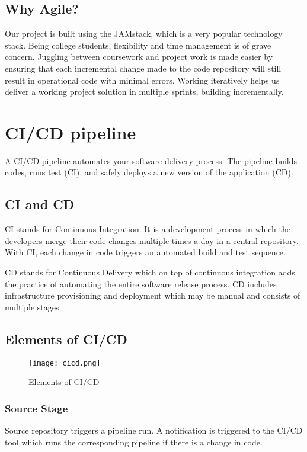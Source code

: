 \subsection{Why Agile?}

Our project is built using the JAMstack, which is a very popular technology stack. 
Being college students, flexibility and time management is of grave concern. Juggling between coursework and 
project work is made easier by ensuring that each incremental change made to the code repository will still 
result in operational code with minimal errors. Working iteratively helps us deliver a working project solution 
in multiple sprints, building incrementally.

\section{CI/CD pipeline}
A CI/CD pipeline automates your software delivery process. The pipeline builds codes, runs test (CI),
and safely deploys a new version of the application (CD).

\subsection{CI and CD}
CI stands for Continuous Integration. It is a development process in which the developers merge
their code changes multiple times a day in a central repository. With CI, each change in code 
triggers an automated build and test sequence.

CD stands for Continuous Delivery which on top of continuous integration adds the practice of 
automating the entire software release process. CD includes infrastructure provisioning and deployment 
which may be manual and consists of multiple stages.~\cite{CICD}

\subsection{Elements of CI/CD}

\begin{figure}[h!]
    \begin{center}
        \texttt{[image: cicd.png]}
    \end{center}
    \caption{Elements of CI/CD}
    \label{fig:cicd}
\end{figure}

\subsubsection{Source Stage}
Source repository triggers a pipeline run. A notification is triggered to the CI/CD tool 
which runs the corresponding pipeline if there is a change in code. 

